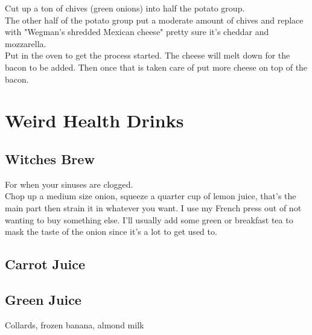 \documentclass{article}
\begin{document}
Cut up a ton of chives (green onions) into half the potato group. \\ 
The other half of the potato group put a moderate amount of chives and replace with "Wegman's shredded Mexican cheese" pretty sure it's cheddar and mozzarella. \\ 
Put in the oven to get the process started. The cheese will melt down for the bacon to be added. Then once that is taken care of put more cheese on top of the bacon. \\ 



\section*{Weird Health Drinks}

\subsection*{Witches Brew} 
For when your sinuses are clogged. \\ 
Chop up a medium size onion, squeeze a quarter cup of lemon juice, that's the main part then strain it in whatever you want. I use my French press out of not wanting to buy something else. I'll usually add some green or breakfast tea to mask the taste of the onion since it's a lot to get used to. 

\subsection*{Carrot Juice} 

\subsection*{Green Juice}
Collards, frozen banana, almond milk 
\end{document}
